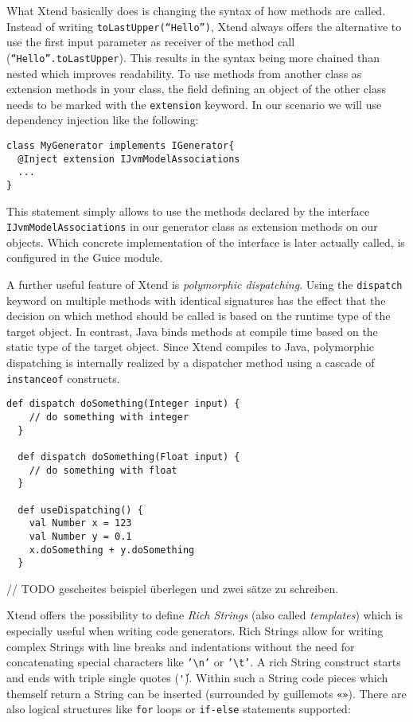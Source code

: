 What Xtend basically does is changing the syntax of how methods are called. Instead
of writing \texttt{toLastUpper(``Hello'')}, Xtend always offers the alternative to
use the first input parameter as receiver of the method call (\texttt{``Hello''.toLastUpper}).
This results in the syntax being more chained than nested which improves readability.
To use methods from another class as extension methods in your class, the field
defining an object of the other class needs to be marked with the \texttt{extension}
keyword. In our scenario we will use dependency injection like the following:

\begin{lstlisting}[language=Xtend]
class MyGenerator implements IGenerator{
  @Inject extension IJvmModelAssociations
  ...
}
\end{lstlisting}

This statement simply allows to use the methods declared by the interface
\newline\texttt{IJvmModelAssociations} in our generator class as extension methods
on our objects. Which concrete implementation of the interface is later actually called, is configured in the Guice module.

A further useful feature of Xtend is \emph{polymorphic dispatching}. Using the \texttt{dispatch}
keyword on multiple methods with identical signatures has the effect that the 
decision on which method should be called is based on the runtime type of the
target object. In contrast, Java binds methods at compile time based on the static
type of the target object. Since Xtend compiles to Java, polymorphic dispatching
is internally realized by a dispatcher method using a cascade of
\texttt{instanceof} constructs. 

\begin{lstlisting}[language=Xtend]
  def dispatch doSomething(Integer input) {
  	// do something with integer
  }
  
  def dispatch doSomething(Float input) {
  	// do something with float
  }
  
  def useDispatching() {
    val Number x = 123
    val Number y = 0.1
    x.doSomething + y.doSomething
  }
\end{lstlisting}

// TODO gescheites beispiel überlegen und zwei sätze zu schreiben.

Xtend offers the possibility to define \emph{Rich Strings} (also called \emph{templates})
which is especially useful when writing code generators. Rich Strings allow for
writing complex Strings with line breaks and indentations without the need for
concatenating special characters like \texttt{'\textbackslash n'} or \texttt{'\textbackslash t'}. A rich String
construct starts and ends with triple single quotes (\texttt{\'\'\'}). Within
such a String code pieces which themself return a String can be inserted (surrounded by guillemots \texttt{«»}).
There are also logical structures like \texttt{for} loops or \texttt{if-else}
statements supported:

